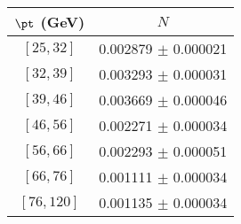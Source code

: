 \begin{tabular}{c||c}
$\pt$ (GeV) & $N$  \\
\hline
$[25, 32]$ & 0.002879 $\pm$ 0.000021\\
$[32, 39]$ & 0.003293 $\pm$ 0.000031\\
$[39, 46]$ & 0.003669 $\pm$ 0.000046\\
$[46, 56]$ & 0.002271 $\pm$ 0.000034\\
$[56, 66]$ & 0.002293 $\pm$ 0.000051\\
$[66, 76]$ & 0.001111 $\pm$ 0.000034\\
$[76, 120]$ & 0.001135 $\pm$ 0.000034\\
\end{tabular}
